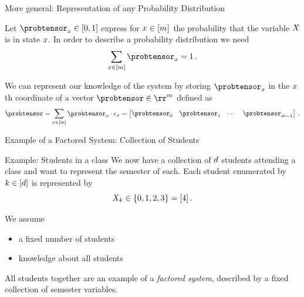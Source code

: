 \documentclass{beamer}
\begin{document}
    \begin{frame}{More general: Representation of any Probability Distribution}

        \begin{example}
            Let $\probtensor_\catindex \in [0,1]$ express for $x_{}\in[m_{}]$ the probability that the variable $X$ is in state $x$.
            In order to describe a probability distribution we need
            \[ \sum_{\catindex\in[\catdim]}\probtensor_\catindex=1 \, .  \]
        \end{example}
        We can represent our knowledge of the system by storing $\probtensor_\catindex$ in the $x$th coordinate of a vector $\probtensor\in\rr^{\catdim}$ defined as
        \[ \probtensor = \sum_{\catindex\in[\catdim]} \probtensor_\catindex \cdot \onehotmapof{\catindex} =
        \begin{bmatrix}
            \probtensor_0 & \probtensor_1 & \cdots & \probtensor_{\catdim-1}
        \end{bmatrix} \, .
        \]
    \end{frame}




    \begin{frame}{Example of a Factored System: Collection of Students}

        \begin{block}{Example: Students in a class}
            We now have a collection of $d$ students attending a class and want to represent the semester of each.
            Each student enumerated by $k\in[d]$ is represented by
            \[ X_{k} \in \{0,1,2,3\} = [4] \, . \]
        \end{block}

        We assume
        \begin{itemize}
            \item a fixed number of students
            \item knowledge about all students
        \end{itemize}

        All students together are an example of a \emph{factored system}, described by a fixed collection of semester variables.

    \end{frame}
\end{document}
